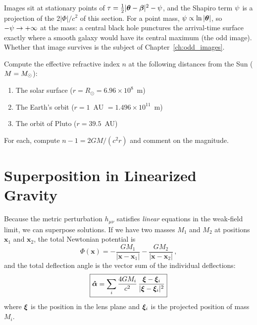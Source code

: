 \begin{bridge}
Images sit at stationary points of
$\tau = \tfrac12|\boldsymbol{\theta} - \boldsymbol{\beta}|^2 - \psi$, and the Shapiro term
$\psi$ is a projection of the $2|\Phi|/c^2$ of this section.  For a point
mass, $\psi \propto \ln|\boldsymbol{\theta}|$, so $-\psi \to +\infty$ at the mass:
a central black hole punctures the arrival-time surface exactly where a
smooth galaxy would have its central maximum (the odd image).  Whether that
image survives is the subject of Chapter~\ref{ch:odd_images}.
\end{bridge}


\begin{exercise}
\label{ex:refractive_index}
Compute the effective refractive index $n$ at the following distances
from the Sun ($M = M_{\odot}$):
\begin{enumerate}[label=(\alph*)]
    \item The solar surface ($r = R_\odot = 6.96 \times 10^8$~m)
    \item The Earth's orbit ($r = 1$~AU $= 1.496 \times 10^{11}$~m)
    \item The orbit of Pluto ($r = 39.5$~AU)
\end{enumerate}
For each, compute $n - 1 = 2GM/(c^2 r)$ and comment on the magnitude.
\end{exercise}


\section{Superposition in Linearized Gravity}
\label{sec:superposition}

Because the metric perturbation $h_{\mu\nu}$ satisfies \emph{linear}
equations in the weak-field limit, we can superpose solutions.  If we
have two masses $M_1$ and $M_2$ at positions $\mathbf{x}_1$ and
$\mathbf{x}_2$, the total Newtonian potential is
\begin{equation}
    \Phi(\mathbf{x}) = -\frac{GM_1}{|\mathbf{x} - \mathbf{x}_1|}
    - \frac{GM_2}{|\mathbf{x} - \mathbf{x}_2|} \,,
    \label{eq:superposition_potential}
\end{equation}
and the total deflection angle is the vector sum of
the individual deflections:
\begin{equation}
    \boxed{
    \boldsymbol{\hat{\alpha}} = \sum_i \frac{4GM_i}{c^2}\,
    \frac{\boldsymbol{\xi} - \boldsymbol{\xi}_i}{|\boldsymbol{\xi} - \boldsymbol{\xi}_i|^2}
    }
    \label{eq:superposition_deflection}
\end{equation}
where $\boldsymbol{\xi}$ is the position in the lens plane and $\boldsymbol{\xi}_i$
is the projected position of mass $M_i$.

